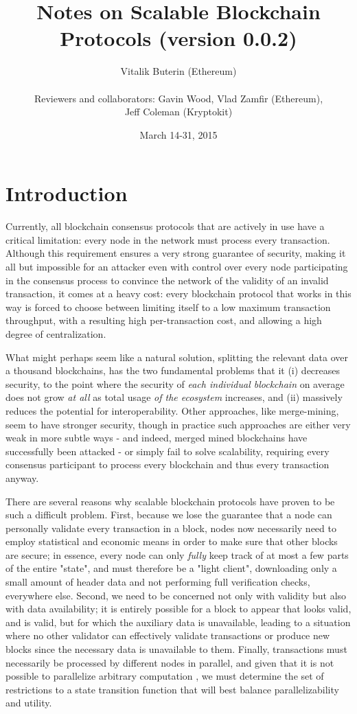 \documentclass[11pt,a4paper]{report}
\title{Notes on Scalable Blockchain Protocols (version 0.0.2)}
\date{March 14-31, 2015}
\author{Vitalik Buterin (Ethereum) \\  \\ Reviewers and collaborators: Gavin Wood, Vlad Zamfir (Ethereum), \\ Jeff Coleman (Kryptokit)}
\theoremstyle{plain}
\theoremstyle{definition}
\theoremstyle{remark}
\begin{document}
\maketitle

\chapter{Introduction}

Currently, all blockchain consensus protocols that are actively in use have a critical limitation: every node in the network must process every transaction. Although this requirement ensures a very strong guarantee of security, making it all but impossible for an attacker even with control over every node participating in the consensus process to convince the network of the validity of an invalid transaction, it comes at a heavy cost: every blockchain protocol that works in this way is forced to choose between limiting itself to a low maximum transaction throughput, with a resulting high per-transaction cost, and allowing a high degree of centralization.

What might perhaps seem like a natural solution, splitting the relevant data over a thousand blockchains, has the two fundamental problems that it (i) decreases security, to the point where the security of \emph{each individual blockchain} on average does not grow \emph{at all} as total usage \emph{of the ecosystem} increases, and (ii) massively reduces the potential for interoperability. Other approaches, like merge-mining, seem to have stronger security, though in practice such approaches are either very weak in more subtle ways \cite{mmpetertodd} - and indeed, merged mined blockchains have successfully been attacked\cite{coiledcoin} - or simply fail to solve scalability, requiring every consensus participant to process every blockchain and thus every transaction anyway.

There are several reasons why scalable blockchain protocols have proven to be such a difficult problem. First, because we lose the guarantee that a node can personally validate every transaction in a block, nodes now necessarily need to employ statistical and economic means in order to make sure that other blocks are secure; in essence, every node can only \emph{fully} keep track of at most a few parts of the entire "state", and must therefore be a "light client", downloading only a small amount of header data and not performing full verification checks, everywhere else. Second, we need to be concerned not only with validity but also with data availability; it is entirely possible for a block to appear that looks valid, and is valid, but for which the auxiliary data is unavailable, leading to a situation where no other validator can effectively validate transactions or produce new blocks since the necessary data is unavailable to them. Finally, transactions must necessarily be processed by different nodes in parallel, and given that it is not possible to parallelize arbitrary computation \cite{parallelcomputing}, we must determine the set of restrictions to a state transition function that will best balance parallelizability and utility.
\end{document}

